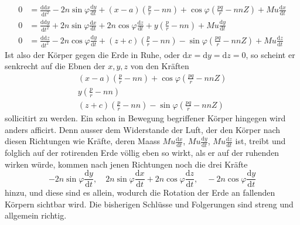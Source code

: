 \[
\begin{aligned}
0&=\tfrac{\mathrm{dd}x}{\mathrm{d}t^2}-2n\sin\varphi\tfrac{\mathrm{d}y}{\mathrm{d}t}+(x-a)(\tfrac pr-nn)+\cos\varphi(\tfrac{pq}{r}-nnZ)+Mu\tfrac{\mathrm{d}x}{\mathrm{d}t}\\
0&=\tfrac{\mathrm{dd}y}{\mathrm{d}t^2}+2n\sin\varphi\tfrac{\mathrm{d}x}{\mathrm{d}t}+2n\cos\varphi\tfrac{\mathrm{d}z}{\mathrm{d}t}+y(\tfrac pr-nn)+Mu\tfrac{\mathrm{d}y}{\mathrm{d}t}\\
0&=\tfrac{\mathrm{dd}z}{\mathrm{d}t^2}-2n\cos\varphi\tfrac{\mathrm{d}y}{\mathrm{d}t}+(z+c)(\tfrac pr-nn)-\sin\varphi(\tfrac{pq}{r}-nnZ)+Mu\tfrac{\mathrm{d}z}{\mathrm{d}t}
\end{aligned}
\]
Ist also der Körper gegen die Erde in Ruhe, oder $\mathrm{d}x=\mathrm{d}y=\mathrm{d}z=0$, so scheint er senkrecht auf die Ebnen der $x,y,z$ von den Kräften
\[
\begin{gathered}
(x-a)(\tfrac pr-nn)+\cos\varphi(\tfrac{pq}{r}-nnZ)\\
y(\tfrac pr-nn)\\
(z+c)(\tfrac pr-nn)-\sin\varphi(\tfrac{pq}{r}-nnZ)
\end{gathered}
\]
sollicitirt zu werden. Ein schon in Bewegung begriffener Körper hingegen wird anders afficirt. Denn ausser dem Widerstande der Luft, der den Körper nach diesen Richtungen wie Kräfte, deren Maass $Mu\tfrac{\mathrm{d}x}{\mathrm{d}t}$, $Mu\tfrac{\mathrm{d}y}{\mathrm{d}t}$, $Mu\tfrac{\mathrm{d}z}{\mathrm{d}t}$ ist, treibt und folglich auf der rotirenden Erde völlig eben so wirkt, als er auf der ruhenden wirken würde, kommen nach jenen Richtungen noch die drei Kräfte
\[
-2n\sin\varphi\frac{\mathrm{d}y}{\mathrm{d}t},\quad 2n\sin\varphi\frac{\mathrm{d}x}{\mathrm{d}t}+2n\cos\varphi\frac{\mathrm{d}z}{\mathrm{d}t},\quad -2n\cos\varphi\frac{\mathrm{d}y}{\mathrm{d}t}
\]
hinzu, und diese sind es allein, wodurch die Rotation der Erde an fallenden Körpern sichtbar wird. Die bisherigen Schlüsse und Folgerungen sind streng und allgemein richtig.

